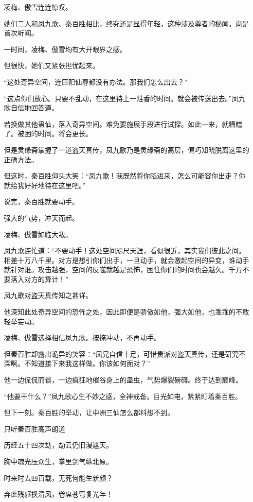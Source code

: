 \begin{this_body}
凌梅、傲雪连连惊叹。

她们二人和凤九歌、秦百胜相比，终究还是显得年轻，这种涉及尊者的秘闻，尚是首次听闻。

一时间，凌梅、傲雪均有大开眼界之感。

但很快，她们又紧张担忧起来。

“这处奇异空间，连巨阳仙尊都没有办法。那我们怎么出去？”

“这点你们放心。只要不乱动，在这里待上一炷香的时间。就会被传送出去。”凤九歌自信地回答道。

若换做其他蛊仙，落入奇异空间。难免要施展手段进行试探。如此一来，就糟糕了。被困的时间。将会更长。

但是灵缘斋掌握了一道盗天真传，凤九歌乃是灵缘斋的高层，偏巧知晓脱离这里的正确方法。

但这时，秦百胜仰头大笑：“凤九歌！我既然将你陷进来，怎么可能容你出走？你就给我好好地待在这里吧。”

说完，秦百胜就要动手。

强大的气势，冲天而起。

凌梅、傲雪如临大敌。

凤九歌连忙道：“不要动手！这处空间咫尺天涯，看似很近，其实我们彼此之间。相差十万八千里。对方是想引你们出手，一旦动手，就会激起空间的异变，谁动手就针对谁。攻击越强，空间的反噬就越是恐怖，困住你们的时间也会越久。千万不要落入对方的算计！”

凤九歌对盗天真传知之甚详。

他深知此处奇异空间的恐怖之处，因此即便是骄傲如他，强大如他，也乖乖的不敢轻举妄动。

凌梅、傲雪选择相信凤九歌。按捺冲动，不再动手。

但秦百胜却露出诡异的笑容：“凤兄自信十足，可惜贵派对盗天真传，还是研究不深啊。不知道接下来我这样做。你该如何面对？”

他一边侃侃而谈，一边疯狂地催谷身上的蛊虫，气势爆裂磅礴。终于达到巅峰。

“他要干什么？”凤九歌心生不妙之感，全神戒备。目光如电，紧紧盯着秦百胜。

但下一刻。秦百胜的举动，让中洲三仙怎么都料想不到。

只听秦百胜高声朗道

历经五十四次劫，劫云仍旧漫遮天。

胸中魂光压众生，拳里剑气纵北原。

时来时去四百载，无死何能生新颜？

弃此残躯换清风，卷席苍穹复光年！


\end{this_body}

